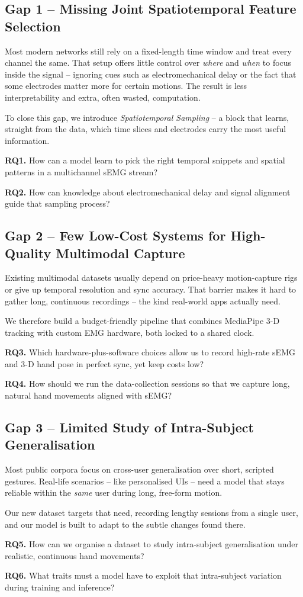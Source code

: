 \subsection*{Gap 1 -- Missing Joint Spatiotemporal Feature Selection}

Most modern networks still rely on a fixed-length time window and treat every channel the same. That setup offers little control over \emph{where} and \emph{when} to focus inside the signal -- ignoring cues such as electromechanical delay or the fact that some electrodes matter more for certain motions. The result is less interpretability and extra, often wasted, computation.

To close this gap, we introduce \textit{Spatiotemporal Sampling} -- a block that learns, straight from the data, which time slices and electrodes carry the most useful information.

\textbf{RQ1.} How can a model learn to pick the right temporal snippets and spatial patterns in a multichannel sEMG stream?  

\textbf{RQ2.} How can knowledge about electromechanical delay and signal alignment guide that sampling process?

\subsection*{Gap 2 -- Few Low-Cost Systems for High-Quality Multimodal Capture}

Existing multimodal datasets usually depend on price-heavy motion-capture rigs or give up temporal resolution and sync accuracy. That barrier makes it hard to gather long, continuous recordings -- the kind real-world apps actually need.

We therefore build a budget-friendly pipeline that combines MediaPipe 3-D tracking with custom EMG hardware, both locked to a shared clock.

\textbf{RQ3.} Which hardware-plus-software choices allow us to record high-rate sEMG and 3-D hand pose in perfect sync, yet keep costs low?  

\textbf{RQ4.} How should we run the data-collection sessions so that we capture long, natural hand movements aligned with sEMG?

\subsection*{Gap 3 -- Limited Study of Intra-Subject Generalisation}

Most public corpora focus on cross-user generalisation over short, scripted gestures. Real-life scenarios -- like personalised UIs -- need a model that stays reliable within the \emph{same} user during long, free-form motion.

Our new dataset targets that need, recording lengthy sessions from a single user, and our model is built to adapt to the subtle changes found there.

\textbf{RQ5.} How can we organise a dataset to study intra-subject generalisation under realistic, continuous hand movements?  

\textbf{RQ6.} What traits must a model have to exploit that intra-subject variation during training and inference?
